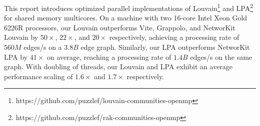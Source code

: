 This report introduces optimized parallel implementations of Louvain\footnote{https://github.com/puzzlef/louvain-communities-openmp} and LPA\footnote{https://github.com/puzzlef/rak-communities-openmp} for shared memory multicores. On a machine with two 16-core Intel Xeon Gold 6226R processors, our Louvain outperforms Vite, Grappolo, and NetworKit Louvain by $50\times$, $22\times$, and $20\times$ respectively, achieving a processing rate of $560 M$ edges/s on a $3.8 B$ edge graph. Similarly, our LPA outperforms NetworKit LPA by $41\times$ on average, reaching a processing rate of $1.4 B$ edges/s on the same graph. With doubling of threads, our Louvain and LPA exhibit an average performance scaling of $1.6\times$ and $1.7\times$ respectively.








